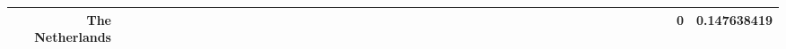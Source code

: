 \documentclass[a4paper,11pt]{report}
\begin{document}
\begin{appendices}
\begin{landscape}
\begin{longtable}{r|r|r|r|r|r|r|r|r|r|r|r|r|r|r|r|r|r|r|r|r|r|r|r|r|r|r|r|r|r|r|r|r|r|r|r|r|r|r|r|r|r|r|r|r|r|r|}
\multicolumn{1}{|r|}{\textbf{The Netherlands}}       &                                       &                                       &                                          &                                       &                                       &                                                     &                                        &                                       &                                      &                                       &                                       &                                                &                                       &                                      &                                       &                                       &                                      &                                       &                                       &                                       &                                      &                                     &                                      &                                         &                                     &                                       &                                          &                                      &                                        &                                       &                                      &                                          &                                      &                                        &                                        &                                     &                                      &                                           &                                               &                                      &                                       &                                              &                                      &                                     & 0                                             & 0.147638419                             \\ \hline
\end{longtable}





\end{landscape}
\end{appendices}
\end{document}
